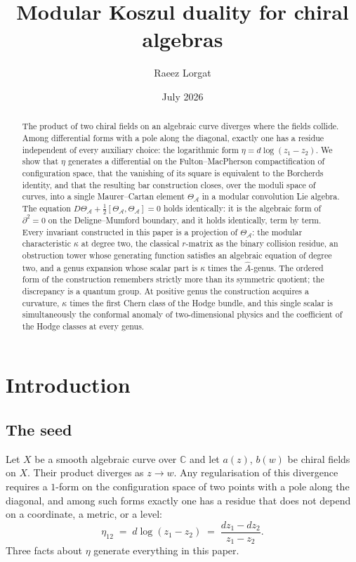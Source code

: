 \documentclass[11pt]{amsart}
\title{Modular Koszul duality for chiral algebras}
\author{Raeez Lorgat}
\date{July 2026}
\numberwithin{equation}{section}
\theoremstyle{plain}
\theoremstyle{definition}
\theoremstyle{remark}
\newcommand{\cA}{\mathcal{A}}
\newcommand{\bC}{\mathbb{C}}
\begin{document}
\begin{abstract}
The product of two chiral fields on an algebraic curve diverges where the fields
collide. Among differential forms with a pole along the diagonal, exactly one has
a residue independent of every auxiliary choice: the logarithmic form
$\eta = d\log(z_1-z_2)$. We show that $\eta$ generates a differential on the
Fulton--MacPherson compactification of configuration space, that the vanishing of
its square is equivalent to the Borcherds identity, and that the resulting bar
construction closes, over the moduli space of curves, into a single
Maurer--Cartan element $\Theta_{\cA}$ in a modular convolution Lie algebra.
The equation $D\Theta_{\cA}+\tfrac12[\Theta_{\cA},\Theta_{\cA}]=0$ holds
identically: it is the algebraic form of
$\partial^2=0$ on the Deligne--Mumford boundary, and it holds identically, term by term.
Every invariant constructed in this paper is a projection of $\Theta_{\cA}$:
the modular characteristic $\kappa$ at degree two, the classical $r$-matrix as
the binary collision residue, an obstruction tower whose generating function
satisfies an algebraic equation of degree two, and a genus expansion whose scalar
part is $\kappa$ times the $\widehat{A}$-genus. The ordered form of the
construction remembers strictly more than its symmetric quotient; the discrepancy
is a quantum group. At positive genus the construction acquires a curvature,
$\kappa$ times the first Chern class of the Hodge bundle, and this single
scalar is simultaneously the conformal anomaly of two-dimensional
physics and the coefficient of the Hodge classes at every genus.
\end{abstract}

\maketitle
\tableofcontents

\section{Introduction}

\subsection{The seed}

Let $X$ be a smooth algebraic curve over $\bC$ and let $a(z)$, $b(w)$ be chiral
fields on $X$. Their product diverges as $z\to w$. Any regularisation of this
divergence requires a $1$-form on the configuration space of two points with a
pole along the diagonal, and among such forms exactly one has a residue that does
not depend on a coordinate, a metric, or a level:
\begin{equation}\label{eq:eta}
\eta_{12} \;=\; d\log(z_1-z_2)\;=\;\frac{dz_1-dz_2}{z_1-z_2}.
\end{equation}
Three facts about $\eta$ generate everything in this paper.
\end{document}
